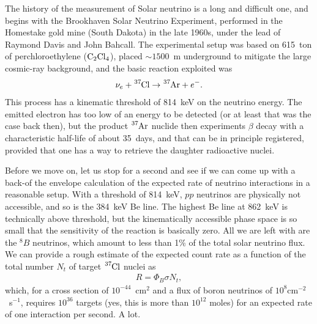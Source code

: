The history of the measurement of Solar neutrino is a long and difficult one, and
begins with the Brookhaven Solar Neutrino Experiment, performed in the Homestake
gold mine (South Dakota) in the late 1960s, under the lead of Raymond Davis and
John Bahcall. The experimental setup was based on 615~ton of perchloroethylene
($\ce{C_2Cl_4}$), placed $\sim 1500$~m underground to mitigate the large cosmic-ray
background, and the basic reaction exploited was
\begin{align*}
  \nu_e + \ce{^37Cl} \rightarrow \ce{^37Ar} + e^-.
\end{align*}
This process has a kinematic threshold of 814~keV on the neutrino energy. The
emitted electron has too low of an energy to be detected (or at least that was
the case back then), but the product $\ce{^37Ar}$ nuclide then experiments
$\beta$ decay with a characteristic half-life of about 35~days, and that can be
in principle registered, provided that one has a way to retrieve the daughter
radioactive nuclei.

Before we move on, let us stop for a second and see if we can come up with a
back-of the envelope calculation of the expected rate of neutrino interactions
in a reasonable setup. With a threshold of 814~keV, $pp$ neutrinos are physically
not accessible, and so is the 384~keV Be line. The highest Be line at 862~keV
is technically above threshold, but the kinematically accessible phase space is
so small that the sensitivity of the reaction is basically zero. All we are left
with are the $^8B$ neutrinos, which amount to less than 1\% of the total
solar neutrino flux. We can provide a rough estimate of the expected count rate
as a function of the total number $N_t$ of target $\ce{^37Cl}$ nuclei as
\begin{align*}
  R = \Phi_B \sigma N_t,
\end{align*}
which, for a cross section of $10^{-44}$~cm$^2$ and a flux of boron neutrinos of
$10^8$cm$^{-2}$~s$^{-1}$, requires $10^{36}$ targets (yes, this is more than
$10^{12}$ moles) for an expected rate of one interaction per second. A lot.

